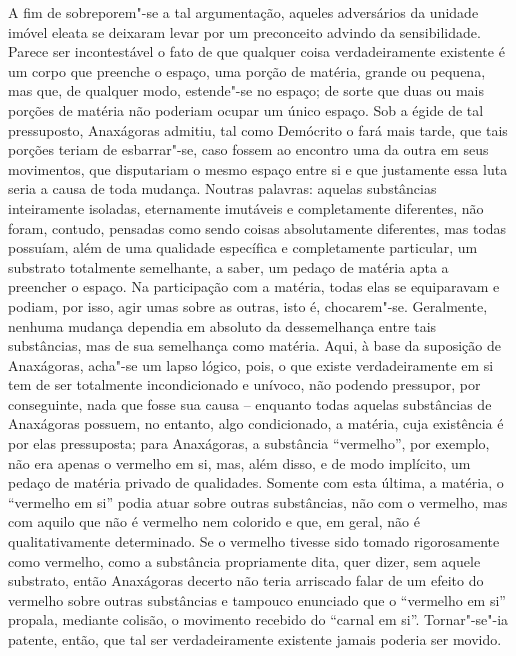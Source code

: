 A fim de sobreporem"-se a tal argumentação, aqueles adversários da
unidade imóvel eleata se deixaram levar por um preconceito advindo da
sensibilidade. Parece ser incontestável o fato de que qualquer coisa
verdadeiramente existente é um corpo que preenche o espaço, uma porção
de matéria, grande ou pequena, mas que, de qualquer modo, estende"-se no
espaço; de sorte que duas ou mais porções de matéria não poderiam ocupar um
único espaço. Sob a égide de tal pressuposto, Anaxágoras admitiu, tal
como Demócrito o fará mais tarde, que tais porções teriam de
esbarrar"-se, caso fossem ao encontro uma da outra em seus movimentos,
que disputariam o mesmo espaço entre si e que justamente essa luta
seria a causa de toda mudança. Noutras palavras: aquelas substâncias
inteiramente isoladas, eternamente imutáveis e completamente diferentes, 
não foram, contudo, pensadas como sendo coisas absolutamente
diferentes, mas todas possuíam, além de uma qualidade específica
e completamente particular, um substrato totalmente semelhante, a
saber, um pedaço de matéria apta a preencher o espaço. Na participação
com a matéria, todas elas se equiparavam e podiam, por isso, agir umas
sobre as outras, isto é, chocarem"-se. Geralmente, nenhuma mudança
dependia em absoluto da dessemelhança entre tais substâncias, mas de
sua semelhança como matéria. Aqui, à base da suposição de Anaxágoras,
acha"-se um lapso lógico, pois, o que existe verdadeiramente em si tem
de ser totalmente incondicionado e unívoco, não podendo pressupor, por
conseguinte, nada que fosse sua causa -- enquanto todas aquelas
substâncias de Anaxágoras possuem, no entanto, algo condicionado, a
matéria, cuja existência é por elas pressuposta; para Anaxágoras, a
substância ``vermelho'', por exemplo, não era apenas o vermelho em si,
mas, além disso, e de modo implícito, um pedaço de matéria privado de
qualidades. Somente com esta última, a matéria, o ``vermelho em si''
podia atuar sobre outras substâncias, não com o vermelho, mas com
aquilo que não é vermelho nem colorido e que, em geral, não é
qualitativamente determinado. Se o vermelho tivesse sido tomado
rigorosamente como vermelho, como a substância propriamente dita, quer
dizer, sem aquele substrato, então Anaxágoras decerto não teria
arriscado falar de um efeito do vermelho sobre outras substâncias e
tampouco enunciado que o ``vermelho em si'' propala, mediante colisão, o
movimento recebido do ``carnal em si''. Tornar"-se"-ia patente, então, que
tal ser verdadeiramente existente jamais poderia ser movido.

\sectionitem


